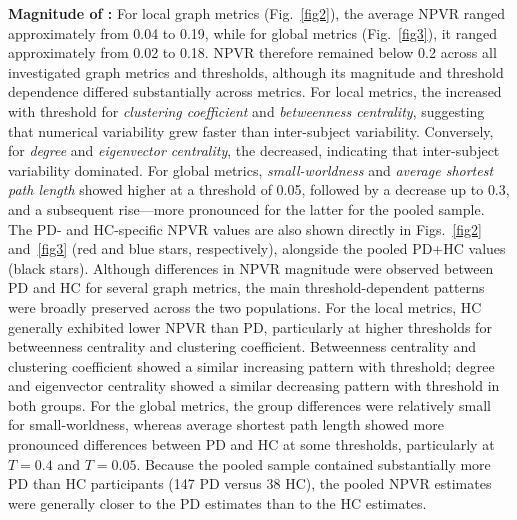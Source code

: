 \textbf{Magnitude of \npvratio{}:}  
For local graph metrics (Fig.~\ref{fig2}), the average NPVR
ranged approximately from 0.04 to 0.19, while for global metrics (Fig.~\ref{fig3}),
it ranged approximately from 0.02 to 0.18. NPVR therefore remained
below 0.2 across all investigated graph metrics and thresholds, although its
magnitude and threshold dependence differed substantially across metrics.
For local metrics, the \npvratio{} increased with threshold for \emph{clustering coefficient} and \emph{betweenness centrality}, suggesting that numerical variability grew faster than inter-subject variability. Conversely, for \emph{degree} and \emph{eigenvector centrality}, the \npvratio{} decreased, indicating that inter-subject variability dominated. For global metrics, \emph{small-worldness} and \emph{average shortest path length} showed higher \npvratio{} at a threshold of 0.05, followed by a decrease up to $0.3$, and a subsequent rise—more pronounced for the latter for the pooled sample. 
The PD- and HC-specific NPVR values are also shown directly in
Figs.~\ref{fig2} and~\ref{fig3} (red and blue stars, respectively), alongside the pooled PD+HC
values (black stars). Although differences in NPVR magnitude were observed
between PD and HC for several graph metrics, the main threshold-dependent
patterns were broadly preserved across the two populations. For the local
metrics, HC generally exhibited lower NPVR than PD, particularly at higher
thresholds for betweenness centrality and clustering coefficient. Betweenness centrality and clustering coefficient showed a similar increasing pattern with threshold; degree and
eigenvector centrality showed a similar decreasing pattern with threshold in
both groups. For the global metrics, the group differences were relatively small
for small-worldness, whereas average shortest path length showed more pronounced
differences between PD and HC at some thresholds, particularly at $T=0.4$ and $T=0.05$.
Because the pooled sample contained substantially more PD than HC participants
(147 PD versus 38 HC), the pooled NPVR estimates were generally closer to the
PD estimates than to the HC estimates.


